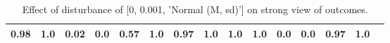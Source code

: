 \begin{table}
\begin{tabular}{l|cc|cc|cc|cc|cc|cc|cc}
\cellcolor{Bittersweet}0.98&\cellcolor{Bittersweet}1.0&\cellcolor{Bittersweet}0.02&\cellcolor{Bittersweet}0.0&0.57&1.0&\cellcolor{Bittersweet}0.97&\cellcolor{Bittersweet}1.0&\cellcolor{Bittersweet}1.0&\cellcolor{Bittersweet}1.0&\cellcolor{Bittersweet}0.0&\cellcolor{Bittersweet}0.0&\cellcolor{Bittersweet}0.97&\cellcolor{Bittersweet}1.0\\\bottomrule\end{tabular}\caption{Effect of disturbance of [0, 0.001, 'Normal (M, sd)'] on strong view of outcomes.}\end{table}
